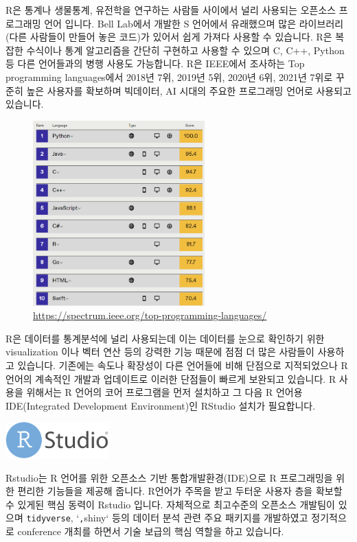 \documentclass[
]{book}
\begin{document}
R은 통계나 생물통계, 유전학을 연구하는 사람들 사이에서 널리 사용되는 오픈소스 프로그래밍 언어 입니다. Bell Lab에서 개발한 S 언어에서 유래했으며 많은 라이브러리 (다른 사람들이 만들어 놓은 코드)가 있어서 쉽게 가져다 사용할 수 있습니다. R은 복잡한 수식이나 통계 알고리즘을 간단히 구현하고 사용할 수 있으며 C, C++, Python 등 다른 언어들과의 병행 사용도 가능합니다. R은 IEEE에서 조사하는 Top programming languages에서 2018년 7위, 2019년 5위, 2020년 6위, 2021년 7위로 꾸준히 높은 사용자를 확보하며 빅데이터, AI 시대의 주요한 프로그래밍 언어로 사용되고 있습니다.

\begin{figure}
\centering
\includegraphics[width=2.60417in,height=\textheight]{images/01/toplanguage2021.png}
\caption{\url{https://spectrum.ieee.org/top-programming-languages/}}
\end{figure}

R은 데이터를 통계분석에 널리 사용되는데 이는 데이터를 눈으로 확인하기 위한 visualization 이나 벡터 연산 등의 강력한 기능 때문에 점점 더 많은 사람들이 사용하고 있습니다. 기존에는 속도나 확장성이 다른 언어들에 비해 단점으로 지적되었으나 R 언어의 계속적인 개발과 업데이트로 이러한 단점들이 빠르게 보완되고 있습니다. R 사용을 위해서는 R 언어의 코어 프로그램을 먼저 설치하고 그 다음 R 언어용 IDE(Integrated Development Environment)인 RStudio 설치가 필요합니다.

\includegraphics[width=1.5625in,height=\textheight]{images/01/rstudio.png}

Rstudio는 R 언어를 위한 오픈소스 기반 통합개발환경(IDE)으로 R 프로그래밍을 위한 편리한 기능들을 제공해 줍니다. R언어가 주목을 받고 두터운 사용자 층을 확보할 수 있게된 핵심 동력이 Rstudio 입니다. 자체적으로 최고수준의 오픈소스 개발팀이 있으며 \texttt{tidyverse}, `\texttt{,}shiny` 등의 데이터 분석 관련 주요 패키지를 개발하였고 정기적으로 conference 개최를 하면서 기술 보급의 핵심 역할을 하고 있습니다.
\end{document}

